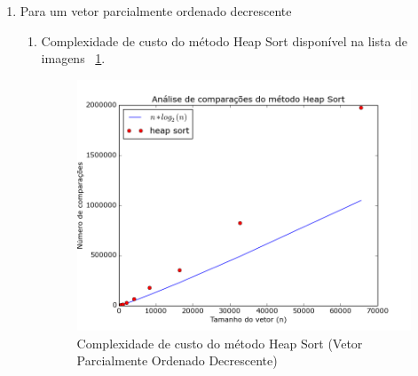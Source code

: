 \documentclass[12pt,a4paper,twoside]{report}
\begin{document}
\begin{enumerate}
\begin{enumerate}
							\end{enumerate}
			
			
			\item Para um vetor parcialmente ordenado decrescente
										\begin{enumerate}
											\item Complexidade de custo do método Heap Sort disponível na lista de imagens ~\ref{fig:HeapPlot1POD}.
											\begin{figure}[!h]
												\centering
												\includegraphics[scale=0.6]{../imagens/Heap/heap_plot_1_parcialmente_ordenado_decrescente.png}
												\caption{Complexidade de custo do método Heap Sort (Vetor Parcialmente Ordenado Decrescente) \label{fig:HeapPlot1POD}}
											\end{figure}
											

\end{enumerate}
\end{enumerate}
\end{document}
